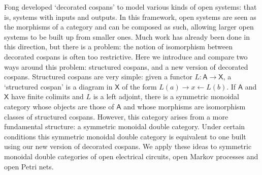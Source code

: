 \documentclass[oneside,final]{ucr}
\theoremstyle{definition}
\newcommand{\maps}{\colon}
\newcommand{\A}{\mathsf{A}}
\newcommand{\X}{\mathsf{X}}
\begin{document}
\begin{frontmatter}
{\ssp
\abstract
Fong developed `decorated cospans' to model various kinds of open systems: that is, systems with inputs and outputs. In this framework, open systems
are seen as the morphisms of a category and can be composed as such, allowing larger open systems to be built up from smaller ones. Much work has already been done in this direction, but there is a problem: the notion of isomorphism between decorated cospans is often too restrictive. Here we introduce and compare two ways around this problem: structured cospans, and a new version of decorated cospans. Structured cospans are very simple: given a functor $L \maps \A \to \X$, a `structured cospan' is a diagram in $\X$ of the form $L(a) \rightarrow x \leftarrow L(b)$. If $\A$ and $\X$ have finite colimits and $L$ is a left adjoint, there is a symmetric monoidal category whose objects are those of $\A$ and whose morphisms are isomorphism classes of structured cospans.   However, this category arises from a more fundamental structure: a symmetric monoidal double category. Under certain conditions this symmetric monoidal double category is equivalent to one built using our new version of decorated cospans. We apply these ideas to symmetric monoidal double categories of open electrical circuits, open Markov processes and open Petri nets.
\endabstract
}
\tableofcontents


\end{frontmatter}
\end{document}
